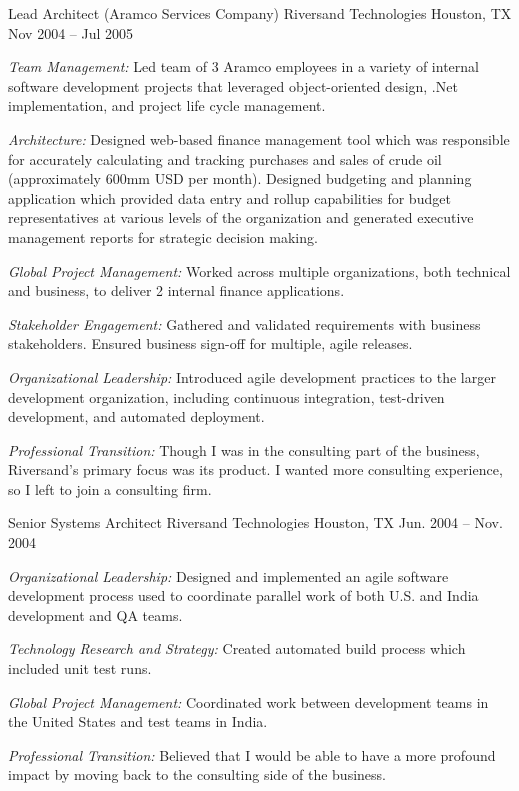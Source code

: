 \begin{cventries}

\cventry 
{Lead Architect (Aramco Services Company)}
{Riversand Technologies}
{Houston, TX}
{Nov 2004 – Jul 2005}
{ %
\begin{cvitems}
\item {\emph{Team Management:} Led team of 3 Aramco employees in a variety of internal software development projects that leveraged object-oriented design, .Net implementation, and project life cycle management.}
\item {\emph{Architecture:} Designed web-based finance management tool which was responsible for accurately calculating and tracking purchases and sales of crude oil (approximately 600mm USD per month). Designed budgeting and planning application which provided data entry and rollup capabilities for budget representatives at various levels of the organization and generated executive management reports for strategic decision making.}
\item {\emph{Global Project Management:} Worked across multiple organizations, both technical and business, to deliver 2 internal finance applications.}
\item {\emph{Stakeholder Engagement:} Gathered and validated requirements with business stakeholders. Ensured business sign-off for multiple, agile releases.}
\item {\emph{Organizational Leadership:} Introduced agile development practices to the larger development organization, including continuous integration, test-driven development, and automated deployment.}
\item {\emph{Professional Transition:} Though I was in the consulting part of the business, Riversand’s primary focus was its product. I wanted more consulting experience, so I left to join a consulting firm.}
\end{cvitems}
}


\cventry 
{Senior Systems Architect}
{Riversand Technologies}
{Houston, TX}
{Jun. 2004 – Nov. 2004}
{ %
\begin{cvitems}
\item {\emph{Organizational Leadership:} Designed and implemented an agile software development process used to coordinate parallel work of both U.S. and India development and QA teams.}
\item {\emph{Technology Research and Strategy:} Created automated build process which included unit test runs.}
\item {\emph{Global Project Management:} Coordinated work between development teams in the United States and test teams in India.}
\item {\emph{Professional Transition:} Believed that I would be able to have a more profound impact by moving back to the consulting side of the business.}
\end{cvitems}
}


\end{cventries}
